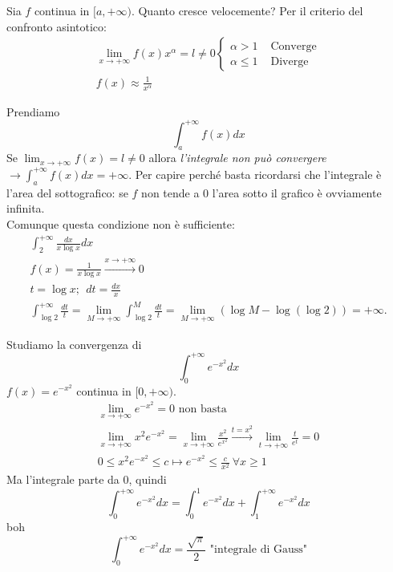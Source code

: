 Sia $f$ continua in $[a, +\infty)$. Quanto cresce velocemente? Per il criterio del confronto asintotico:
\begin{gather}
    \lim_{x\to +\infty}f(x)x^{\alpha} = l\not=0 \begin{cases}
        \alpha > 1 & \text{ Converge} \\
        \alpha \leq 1 &\text{ Diverge}
    \end{cases} \\
    f(x) \approx \frac{1}{x^\alpha}
\end{gather}

\begin{osservazione}
    Prendiamo
    \begin{equation}
        \int_{a}^{+\infty} f(x) dx
    \end{equation}
    Se $\lim_{x\to +\infty}f(x)=l\not=0$ allora \textit{l'integrale non può convergere} $\to \int_{a}^{+\infty} f(x) dx=+\infty$. Per capire perché basta ricordarsi che l'integrale è l'area del sottografico: se $f$ non tende a 0 l'area sotto il grafico è ovviamente infinita. \\
    Comunque questa condizione non è sufficiente:
    \begin{gather*}
        \int_{2}^{+\infty} \frac{dx}{x\log x} dx \\
        f(x) = \frac{1}{x \log x} \xrightarrow{x\to+\infty}0 \\
        t = \log x;\ \ dt = \frac{dx}{x} \\
        \int_{\log 2}^{+\infty} \frac{dt}{t} = \lim_{M\to +\infty}\int_{\log 2}^{M} \frac{dt}{t} = \lim_{M\to +\infty}(\log M-\log(\log2)) = +\infty.
    \end{gather*}
\end{osservazione}

\begin{esempio}
    Studiamo la convergenza di
    \begin{equation}
        \int_{0}^{+\infty} e^{-x^2} dx
    \end{equation}
    $f(x) = e^{-x^2}$ continua in $[0, +\infty)$.
    \begin{gather*}
        \lim_{x\to +\infty}e^{-x^2}=0 \text{ non basta} \\
        \lim_{x\to +\infty}x^2e^{-x^2} = \lim_{x\to +\infty} \frac{x^2}{e^{x^2}} \xrightarrow{t=x^2} \lim_{t\to +\infty} \frac{t}{e^t} = 0 \\
        0\leq x^2e^{-x^2}\leq c \mapsto e^{-x^2}\leq \frac{c}{x^2}\ \forall x\geq 1
    \end{gather*}
    Ma l'integrale parte da 0, quindi
    \begin{equation*}
        \int_{0}^{+\infty} e^{-x^2} dx = \int_{0}^{1} e^{-x^2} dx + \int_{1}^{+\infty} e^{-x^2} dx
    \end{equation*}
    boh
    \begin{equation}
        \int_{0}^{+\infty} e^{-x^2} dx = \frac{\sqrt{\pi}}{2} \text{ "integrale di Gauss"}
    \end{equation}
\end{esempio}

